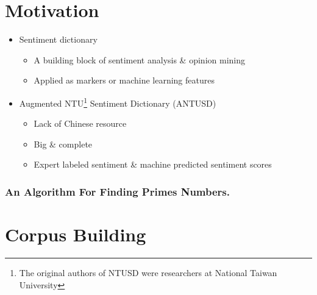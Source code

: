 \documentclass[compress]{beamer}
\begin{document}
\section{Motivation}
    \begin{frame}{\secname}
        \begin{itemize}
            \item Sentiment dictionary
            \begin{itemize}
                \item A building block of sentiment analysis \& opinion mining
                \item Applied as markers or machine learning features
            \end{itemize}
            \item Augmented NTU\footnote{The original authors of NTUSD were researchers at National Taiwan University} Sentiment Dictionary (ANTUSD)
            \begin{itemize}
                \item Lack of Chinese resource
                \item Big \& complete
                \item Expert labeled sentiment \& machine predicted sentiment scores
            \end{itemize}
        \end{itemize}
    \end{frame}
\begin{frame}[fragile]
\frametitle{An Algorithm For Finding Primes Numbers.}
\begin{semiverbatim}
\end{semiverbatim}
\end{frame}

\section{Corpus Building}
\end{document}
